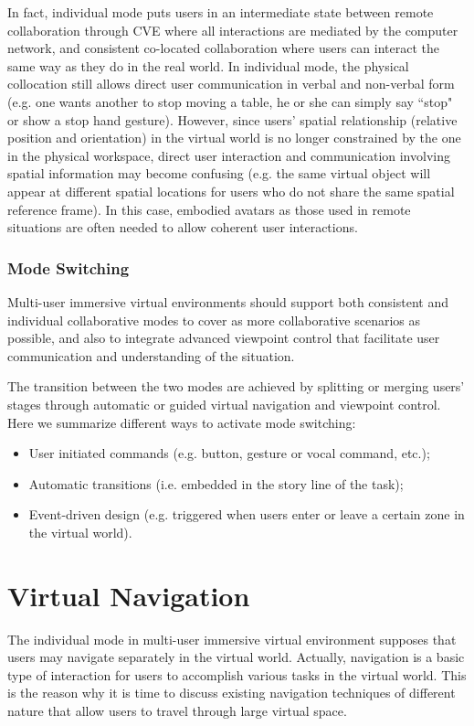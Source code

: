 In fact, individual mode puts users in an intermediate state between remote collaboration through CVE where all interactions are mediated by the computer network, and consistent co-located collaboration where users can interact the same way as they do in the real world. In individual mode, the physical collocation still allows direct user communication in verbal and non-verbal form (e.g. one wants another to stop moving a table, he or she can simply say ``stop" or show a stop hand gesture). However, since users' spatial relationship (relative position and orientation) in the virtual world is no longer constrained by the one in the physical workspace, direct user interaction and communication involving spatial information may become confusing (e.g. the same virtual object will appear at different spatial locations for users who do not share the same spatial reference frame). In this case, embodied avatars as those used in remote situations are often needed to allow coherent user interactions.

\subsubsection{Mode Switching}
Multi-user immersive virtual environments should support both consistent and individual collaborative modes to cover as more collaborative scenarios as possible, and also to integrate advanced viewpoint control that facilitate user communication and understanding of the situation.

The transition between the two modes are achieved by splitting or merging users' stages through automatic or guided virtual navigation and viewpoint control. Here we summarize different ways to activate mode switching:

\begin{itemize}
\item User initiated commands (e.g. button, gesture or vocal command, etc.);
\item Automatic transitions (i.e. embedded in the story line of the task);
\item Event-driven design (e.g. triggered when users enter or leave a certain zone in the virtual world).
\end{itemize}



\section{Virtual Navigation}
\label{sec:navigation}
The individual mode in multi-user immersive virtual environment supposes that users may navigate separately in the virtual world. Actually, navigation is a basic type of interaction for users to accomplish various tasks in the virtual world. This is the reason why it is time to discuss existing navigation techniques of different nature that allow users to travel through large virtual space.


